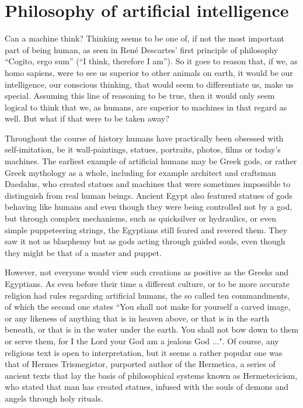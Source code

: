 \section{Philosophy of artificial intelligence}
Can a machine think? Thinking seems to be one of, if not the most important part of being human, as seen in René Descartes' 
first principle of philosophy “Cogito, ergo sum” (“I think, therefore I am”). So it goes to reason that, if we, as 
homo sapiens, were to see us superior to other animals on earth, it would be our intelligence, our conscious thinking, 
that would seem to differentiate us, make us special. Assuming this line of reasoning to be true, then it would only 
seem logical to think that we, as humans, are superior to machines in that regard as well. But what if that were to be taken away?

Throughout the course of history humans have practically been obsessed with self-imitation, be it wall-paintings, 
statues, portraits, photos, films or today's machines. The earliest example of artificial humans may be Greek gods, 
or rather Greek mythology as a whole, including for example architect and craftsman Daedalus, who created statues and 
machines that were sometimes impossible to distinguish from real human beings. Ancient Egypt also featured statues of 
gods behaving like humans and even though they were being controlled not by a god, but through complex mechanisms, 
such as quicksilver or hydraulics, or even simple puppeteering strings, the Egyptians still feared and revered them. 
They saw it not as blasphemy but as gods acting through guided souls, even though they might be that of a master and puppet.

However, not everyone would view such creations as positive as the Greeks and Egyptians. As even before their 
time a different culture, or to be more accurate religion had rules regarding artificial humans, the so called 
ten commandments, of which the second one states “You shall not make for yourself a carved image, or any likeness 
of anything that is in heaven above, or that is in the earth beneath, or that is in the water under the earth. 
You shall not bow down to them or serve them, for I the Lord your God am a jealous God ...". Of course, any religious 
text is open to interpretation, but it seems a rather popular one was that of Hermes Trismegistor, purported author 
of the Hermetica, a series of ancient texts that lay the basis of philosophical systems known as Hermetecicism, 
who stated that man has created statues, infused with the souls of demons and angels through holy rituals.

